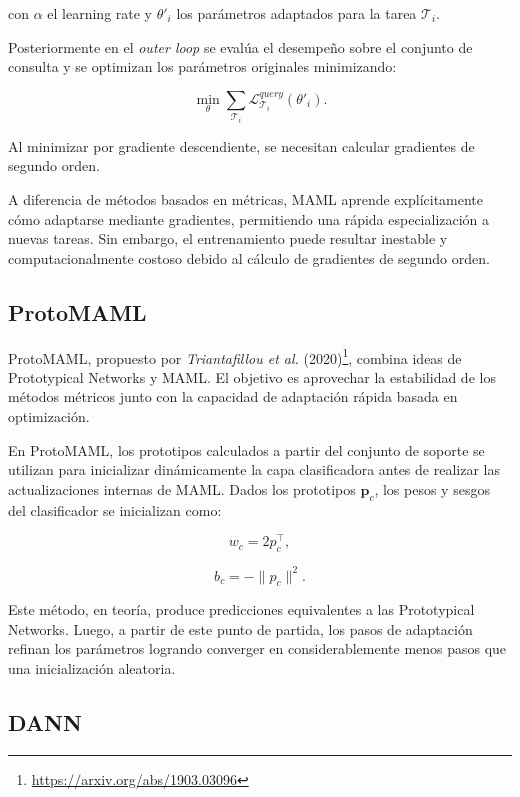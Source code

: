 con $\alpha$ el learning rate y $\theta'_i$ los parámetros adaptados para la tarea $\mathcal{T}_i$.

Posteriormente en el \textit{outer loop} se evalúa el desempeño sobre el conjunto de consulta y se optimizan los parámetros originales minimizando:

\begin{equation}
\min_\theta \sum_{\mathcal{T}_i}
\mathcal{L}_{\mathcal{T}_i}^{query}(\theta'_i).
\end{equation}

Al minimizar por gradiente descendiente, se necesitan calcular gradientes de segundo orden.

A diferencia de métodos basados en métricas, MAML aprende explícitamente cómo adaptarse mediante gradientes, permitiendo una rápida especialización a nuevas tareas. Sin embargo, el entrenamiento puede resultar inestable y computacionalmente costoso debido al cálculo de gradientes de segundo orden.

\subsection{ProtoMAML}

ProtoMAML, propuesto por \textit{Triantafillou et al.} (2020)\footnote{\url{https://arxiv.org/abs/1903.03096}}, combina ideas de Prototypical Networks y MAML. El objetivo es aprovechar la estabilidad de los métodos métricos junto con la capacidad de adaptación rápida basada en optimización.

En ProtoMAML, los prototipos calculados a partir del conjunto de soporte se utilizan para inicializar dinámicamente la capa clasificadora antes de realizar las actualizaciones internas de MAML. Dados los prototipos $\mathbf{p}_c$, los pesos y sesgos del clasificador se inicializan como:

\begin{equation}
w_c = 2p^{\intercal}_c,
\end{equation}

\begin{equation}
b_c = -\|p_c\|^2.
\end{equation}

Este método, en teoría, produce predicciones equivalentes a las Prototypical Networks. Luego, a partir de este punto de partida, los pasos de adaptación refinan los parámetros logrando converger en considerablemente menos pasos que una inicialización aleatoria.

\subsection{DANN}

